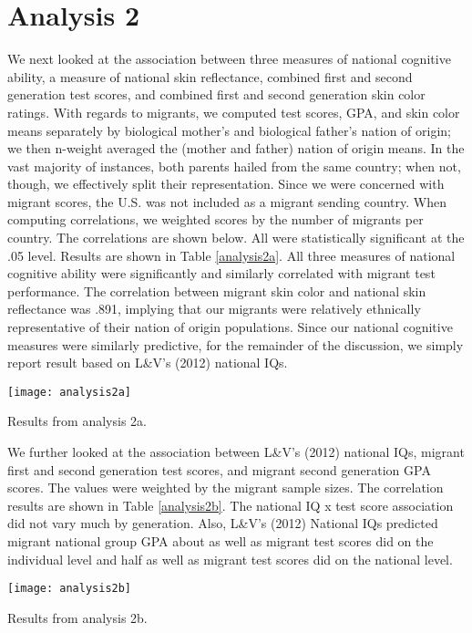 \documentclass[a4paper,12pt]{article}
\begin{document}
\section{Analysis 2}
We next looked at the association between three measures of national cognitive ability, a measure of national skin reflectance, combined first and second generation test scores, and combined first and second generation skin color ratings. With regards to migrants, we computed test scores, GPA, and skin color means separately by biological mother's and biological father's nation of origin; we then n-weight averaged the (mother and father) nation of origin means. In the vast majority of instances, both parents hailed from the same country; when not, though, we effectively split their representation. Since we were concerned with migrant scores, the U.S. was not included as a migrant sending country. When computing correlations, we weighted scores by the number of migrants per country. The correlations are shown below. All were statistically significant at the .05 level. Results are shown in Table \ref{analysis2a}. All three measures of national cognitive ability were significantly and similarly correlated with migrant test performance. The correlation between migrant skin color and national skin reflectance was .891, implying that our migrants were relatively ethnically representative of their nation of origin populations. Since our national cognitive measures were similarly predictive, for the remainder of the discussion, we simply report result based on L\&V's (2012) national IQs.

\begin{table}[H]
\centering
\texttt{[image: analysis2a]}
\caption{Results from analysis 2a.}\label{analysis2a}
\end{table}

We further looked at the association between L\&V's (2012) national IQs, migrant first and second generation test scores, and migrant second generation GPA scores. The values were weighted by the migrant sample sizes. The correlation results are shown in Table \ref{analysis2b}. The national IQ x test score association did not vary much by generation. Also, L\&V's (2012) National IQs predicted migrant national group GPA about as well as migrant test scores did on the individual level and half as well as migrant test scores did on the national level.

\begin{table}[H]
\centering
\texttt{[image: analysis2b]}
\caption{Results from analysis 2b.}\label{analysis2b}
\end{table}
\end{document}
